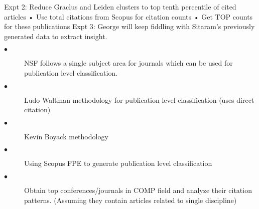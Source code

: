 \documentclass[11pt, oneside]{article}   	%
\begin{document}
Expt 2: Reduce Graclus and Leiden clusters to top tenth percentile of cited articles
• Use total citations from Scopus for citation counts
• Get TOP counts for these publications
Expt 3: George will keep fiddling with Sitaram's previously generated data to extract insight.





\begin{description}
\item[$\bullet$ ] NSF follows a single subject area for journals which can be used for publication level classification.
\item[$\bullet$ ] Ludo Waltman methodology for publication-level classification (uses direct citation)
\item[$\bullet$ ] Kevin Boyack methodology 
\item[$\bullet$ ] Using Scopus FPE to generate publication level classification
\item[$\bullet$ ] Obtain top conferences/journals in COMP field and analyze their citation patterns. (Assuming they contain articles related to single discipline)
\end{description}
\end{document}
